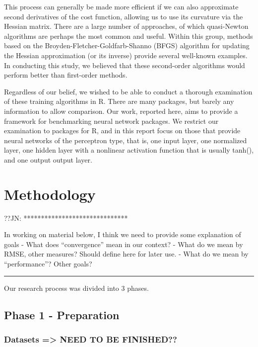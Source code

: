 This process can generally be made more efficient if we can also
approximate second derivatives of the cost function, allowing us to use
its curvature via the Hessian matrix. There are a large number of
approaches, of which quasi-Newton algorithms are perhaps the most common
and useful. Within this group, methods based on the
Broyden-Fletcher-Goldfarb-Shanno (BFGS) algorithm for updating the
Hessian approximation (or its inverse) provide several well-known
examples. In conducting this study, we believed that these second-order
algorithms would perform better than first-order methods.

Regardless of our belief, we wished to be able to conduct a thorough
examination of these training algorithms in R. There are many packages,
but barely any information to allow comparison. Our work, reported here,
aims to provide a framework for benchmarking neural network packages. We
restrict our examination to packages for R, and in this report focus on
those that provide neural networks of the perceptron type, that is, one
input layer, one normalized layer, one hidden layer with a nonlinear
activation function that is usually tanh(), and one output output layer.

\hypertarget{methodology}{%
\section{Methodology}\label{methodology}}

??JN: ******************************

In working on material below, I think we need to provide some
explanation of goals - What does ``convergence'' mean in our context? -
What do we mean by RMSE, other measures? Should define here for later
use. - What do we mean by ``performance''? Other goals?

\begin{center}\rule{0.5\linewidth}{0.5pt}\end{center}

Our research process was divided into 3 phases.

\hypertarget{phase-1---preparation}{%
\subsection{Phase 1 - Preparation}\label{phase-1---preparation}}

\hypertarget{datasets-need-to-be-finished}{%
\subsubsection{Datasets =\textgreater{} NEED TO BE
FINISHED??}\label{datasets-need-to-be-finished}}

